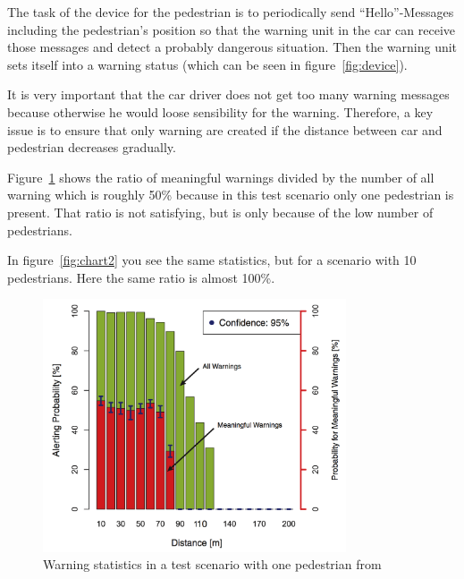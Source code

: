 \documentclass[]{ccs-thesis}
\begin{document}
The task of the device for the pedestrian is to periodically send \enquote{Hello}-Messages including the pedestrian's position so that the warning unit in the car can receive those messages and detect a probably dangerous situation. Then the warning unit sets itself into a warning status (which can be seen in figure~\ref{fig:device}).

It is very important that the car driver does not get too many warning messages because otherwise he would loose sensibility for the warning. Therefore, a key issue is to ensure that only warning are created if the distance between car and pedestrian decreases gradually.

Figure~\ref{fig:chart1} shows the ratio of meaningful warnings divided by the number of all warning which is roughly 50\% because in this test scenario only one pedestrian is present. That ratio is not satisfying, but is only because of the low number of pedestrians.

In figure~\ref{fig:chart2} you see the same statistics, but for a scenario with 10 pedestrians. Here the same ratio is almost 100\%.


\begin{figure}[h]
	\centering
	\includegraphics[width=0.8\textwidth]{figures/2_chart}
	\caption{Warning statistics in a test scenario with one pedestrian from \cite{v2pprotection}}%
	\label{fig:chart1}%
\end{figure}
\end{document}
